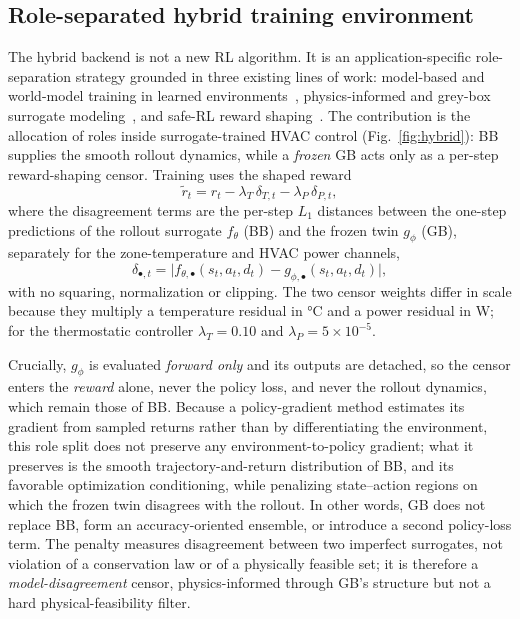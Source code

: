 \documentclass[5p]{elsarticle}
\begin{document}
\subsection{Role-separated hybrid training environment}\label{ssec:hybrid}
The hybrid backend is not a new RL algorithm. It is an application-specific role-separation strategy
grounded in three existing lines of work: model-based and world-model training in learned
environments~\cite{Sutton1991Dyna,Hafner2025Dreamer}, physics-informed and grey-box surrogate
modeling~\cite{Bacher2011RCIdentification,Raissi2019PINN,Willard2022PIML}, and safe-RL reward
shaping~\cite{Garcia2015SafeRL,Wang2025SafeDRL}. The contribution is the allocation of roles inside
surrogate-trained HVAC control (Fig.~\ref{fig:hybrid}): BB supplies the smooth rollout dynamics,
while a \emph{frozen} GB acts only as a per-step reward-shaping censor. Training uses the shaped
reward
\begin{equation}
\tilde{r}_t=r_t-\lambda_T\,\delta_{T,t}-\lambda_P\,\delta_{P,t},
\label{eq:hybrid}
\end{equation}
where the disagreement terms are the per-step $L_1$ distances between the one-step predictions of
the rollout surrogate $f_\theta$ (BB) and the frozen twin $g_\phi$ (GB), separately for the
zone-temperature and HVAC power channels,
\begin{equation*}
\delta_{\bullet,t}=\big|f_{\theta,\bullet}(s_t,a_t,d_t)-g_{\phi,\bullet}(s_t,a_t,d_t)\big|,
\end{equation*}
with no squaring, normalization or clipping. The two censor weights differ in scale because they
multiply a temperature residual in \si{\celsius} and a power residual in \si{\watt}; for the
thermostatic controller $\lambda_T=0.10$ and $\lambda_P=5\times10^{-5}$.

Crucially, $g_\phi$ is evaluated \emph{forward only} and its outputs are detached, so the censor
enters the \emph{reward} alone, never the policy loss, and never the rollout dynamics, which remain
those of BB. Because a policy-gradient method estimates its gradient from sampled returns rather
than by differentiating the environment, this role split does not preserve any
environment-to-policy gradient; what it preserves is the smooth trajectory-and-return distribution
of BB, and its favorable optimization conditioning, while penalizing state--action regions on which
the frozen twin disagrees with the rollout. In other words, GB does not replace BB, form an
accuracy-oriented ensemble, or introduce a second policy-loss term. The penalty measures
disagreement between two imperfect surrogates, not violation of a conservation law or of a
physically feasible set; it is therefore a \emph{model-disagreement} censor, physics-informed
through GB's structure but not a hard physical-feasibility filter.
\end{document}
